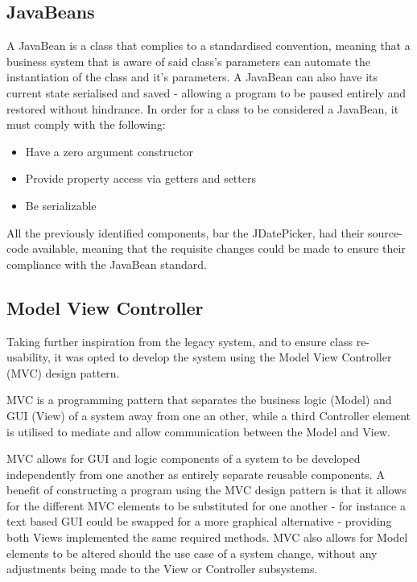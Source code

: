 \documentclass[12pt, a4paper,titlepage]{article}
\begin{document}
\subsection{JavaBeans}
A JavaBean is a class that complies to a standardised convention, meaning that
a business system that is aware of said class’s parameters can automate the
instantiation of the class and it’s parameters. 
A JavaBean can also have its current state serialised and saved - allowing a
program to be paused entirely and restored without hindrance.  
In order for a class to be considered a JavaBean, it must comply with the
following:
\begin{itemize}
    \item Have a zero argument constructor
    \item Provide property access via getters and setters
    \item Be serializable
\end{itemize}

All the previously identified components, bar the JDatePicker, had their
source-code available, meaning that the requisite changes could be made to
ensure their compliance with the JavaBean standard.

\subsection{Model View Controller}
Taking further inspiration from the legacy system, and to ensure class
re-usability, it was opted to develop the system using the Model View
Controller (MVC) design pattern.

MVC is a programming  pattern that separates the business logic (Model) and GUI
(View) of a system away from one an other, while a third Controller element is
utilised to mediate and allow communication between the Model and View. 

MVC allows for GUI and logic components of a system to be developed
independently from one another as entirely separate reusable components.  
A benefit of constructing a program using the MVC design pattern is that it
allows for the different MVC elements to be substituted for one another - for
instance a text based GUI could be swapped for a more graphical alternative -
providing both Views implemented the same required methods.
MVC also allows for Model elements to be altered should the use case of a
system change, without any adjustments being made to the View or Controller
subsystems.
\end{document}
